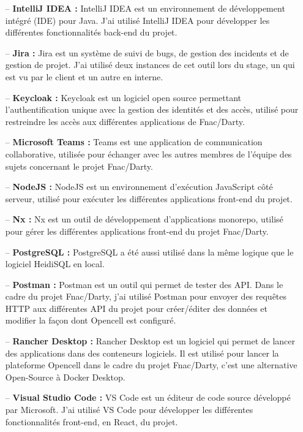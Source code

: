 \documentclass[12pt, a4paper]{report}
\begin{document}
\begin{itemize}
		\item[–] \textbf{IntelliJ IDEA :} IntelliJ IDEA est un environnement de développement intégré (IDE) pour Java. J'ai utilisé IntelliJ IDEA pour développer les différentes fonctionnalités back-end du projet.
		\vspace{0.5cm}
		\item[–] \textbf{Jira :} Jira est un système de suivi de bugs, de gestion des incidents et de gestion de projet. J'ai utilisé deux instances de cet outil lors du stage, un qui est vu par le client et un autre en interne.
		\vspace{0.5cm}
		\item[–] \textbf{Keycloak :} Keycloak est un logiciel open source permettant l'authentification unique avec la gestion des identités et des accès, utilisé pour restreindre les accès aux différentes applications de Fnac/Darty.
		\vspace{0.5cm}
		\item[–] \textbf{Microsoft Teams :} Teams est une application de communication collaborative, utilisée pour échanger avec les autres membres de l'équipe des sujets concernant le projet Fnac/Darty.
		\vspace{0.5cm}
		\newpage
		\item[–] \textbf{NodeJS :} NodeJS est un environnement d'exécution JavaScript côté serveur, utilisé pour exécuter les différentes applications front-end du projet.
		\vspace{0.5cm}
		\item[–] \textbf{Nx :} Nx est un outil de développement d'applications monorepo, utilisé pour gérer les différentes applications front-end du projet Fnac/Darty.
		\vspace{0.5cm}
		\item[–] \textbf{PostgreSQL :} PostgreSQL a été aussi utilisé dans la même logique que le logiciel HeidiSQL en local.
		\vspace{0.5cm}
		\item[–] \textbf{Postman :} Postman est un outil qui permet de tester des API. Dans le cadre du projet Fnac/Darty, j'ai utilisé Postman pour envoyer des requêtes HTTP aux différentes API du projet pour créer/éditer des données et modifier la façon dont Opencell est configuré.
		\vspace{0.5cm}
		\item[–] \textbf{Rancher Desktop :} Rancher Desktop est un logiciel qui permet de lancer des applications dans des conteneurs logiciels. Il est utilisé pour lancer la plateforme Opencell dans le cadre du projet Fnac/Darty, c'est une alternative Open-Source à Docker Desktop.
		\vspace{0.5cm}
		\item[–] \textbf{Visual Studio Code :} VS Code est un éditeur de code source développé par Microsoft. J'ai utilisé VS Code pour développer les différentes fonctionnalités front-end, en React, du projet.\vspace{0.5cm}
	\end{itemize}
\end{document}
